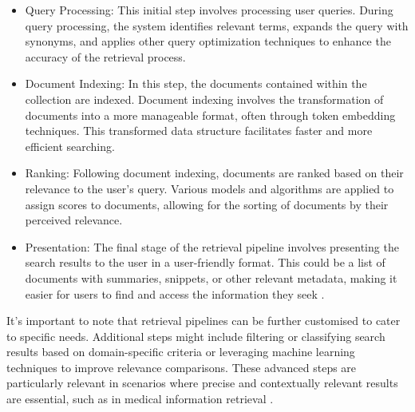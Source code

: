\begin{itemize}
    \item Query Processing: This initial step involves processing user queries. During query processing, the system identifies relevant terms, expands the query with synonyms, and applies other query optimization techniques to enhance the accuracy of the retrieval process.
    \item Document Indexing: In this step, the documents contained within the collection are indexed. Document indexing involves the transformation of documents into a more manageable format, often through token embedding techniques. This transformed data structure facilitates faster and more efficient searching.
    \item Ranking: Following document indexing, documents are ranked based on their relevance to the user's query. Various models and algorithms are applied to assign scores to documents, allowing for the sorting of documents by their perceived relevance.
    \item Presentation: The final stage of the retrieval pipeline involves presenting the search results to the user in a user-friendly format. This could be a list of documents with summaries, snippets, or other relevant metadata, making it easier for users to find and access the information they seek \cite{chen, zendel}.
\end{itemize}

It's important to note that retrieval pipelines can be further customised to cater to specific needs. Additional steps might include filtering or classifying search results based on domain-specific criteria or leveraging machine learning techniques to improve relevance comparisons. These advanced steps are particularly relevant in scenarios where precise and contextually relevant results are essential, such as in medical information retrieval \cite{lu}.